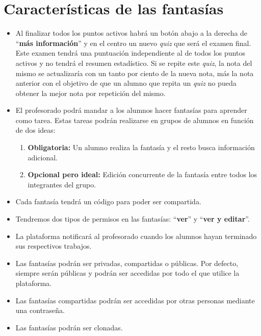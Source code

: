 \section{Características de las fantasías}
\begin{itemize}
	\item Al finalizar todos los puntos activos habrá un botón abajo a la derecha de ``\textbf{más información}'' y en el centro un nuevo \textit{quiz} que será el examen final. Este examen tendrá una puntuación independiente al de todos los puntos activos y no tendrá el resumen estadístico. Si se repite este \textit{quiz}, la nota del mismo se actualizaría con un tanto por ciento de la nueva nota, más la nota anterior con el objetivo de que un alumno que repita un \textit{quiz} no pueda obtener la mejor nota por repetición del mismo.
	\item El profesorado podrá mandar a los alumnos hacer fantasías para aprender como tarea. Estas tareas podrán realizarse en grupos de alumnos en función de dos ideas:
	\begin{enumerate}
		\item \textbf{Obligatoria:} Un alumno realiza la fantasía y el resto busca información adicional.
		\item \textbf{Opcional pero ideal:} Edición concurrente de la fantasía entre todos los integrantes del grupo.
	\end{enumerate}
	\item Cada fantasía tendrá un código para poder ser compartida.
	\item Tendremos dos tipos de permisos en las fantasías: ``\textbf{ver}'' y ``\textbf{ver y editar}''.
	\item La plataforma notificará al profesorado cuando los alumnos hayan terminado sus respectivos trabajos.
	\item Las fantasías podrán ser privadas, compartidas o públicas. Por defecto, siempre serán públicas y podrán ser accedidas por todo el que utilice la plataforma.
	\item Las fantasías compartidas podrán ser accedidas por otras personas mediante una contraseña.
	\item Las fantasías podrán ser clonadas.
\end{itemize}

